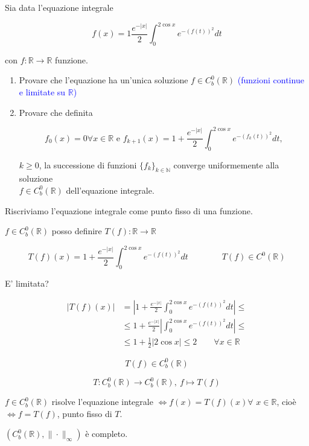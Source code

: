 \begin{exbar}
\begin{example}
	Sia data l'equazione integrale 
	
	$$f(x)=1\frac{e^{-{|x|}}}{2}\int_{0}^{2\cos x}e^{-(f(t))^2}dt$$ 
	
	con $f:\mathbb{R} \rightarrow \mathbb{R}$ funzione.
	
	\begin{enumerate}
		\item Provare che l'equazione ha un'unica soluzione $f \in C^0_b (\mathbb{R})$ \textcolor{blue}{(funzioni continue e limitate su $\mathbb{R}$)}
		
		\item Provare che definita 
		
		$$f_0(x)=0 \forall x \in \mathbb{R} \text{ e } f_{k+1}(x)=1+\frac{e^{-{|x|}}}{2}\int_{0}^{2\cos x}e^{-(f_k(t))^2}dt,$$
		
		$k \geq 0$, la successione di funzioni $\{f_{k}\}_{k \in \mathbb{N}}$ converge uniformemente alla soluzione \\%
		$f \in C^0_b(\mathbb{R})$ dell'equazione integrale.
	\end{enumerate}
	
	Riscriviamo l'equazione integrale come punto fisso di una funzione.
	
	$f\in C^0_b(\mathbb{R})$ posso definire $ T(f):\mathbb{R} \rightarrow \mathbb{R}$
	
	$$T(f)(x)= 1+\frac{e^{-{|x|}}}{2}\int_{0}^{2\cos x}e^{-(f(t))^2}dt \qquad\qquad T(f)\in C^0(\mathbb{R})$$
	
	E' limitata? 
	
	\begin{align*} 
		|T(f)(x)|
		&=|1+\frac{e^{-{|x|}}}{2}\int_{0}^{2\cos x}e^{-(f(t))^2}dt| \leq
		\\
		&\leq 1+ \frac{e^{-{|x|}}}{2}|\int_{0}^{2\cos x}e^{-(f(t))^2}dt|\leq
		\\
		&\leq 1+\frac{1}{2}|2\cos x|\leq 2 \qquad \forall x \in \mathbb{R}
	\end{align*}

	$$T(f)\in C^0_b (\mathbb{R})$$
	
	$$T: C^0_b(\mathbb{R}) \rightarrow C^0_b(\mathbb{R}), \ f \mapsto T(f)$$
	
	$f \in C^0_b(\mathbb{R})$ risolve l'equazione integrale $\Leftrightarrow f(x)= T(f)(x)\forall\,\, x \in \mathbb{R}$, cioè $\Leftrightarrow f=T(f)$, punto fisso di $T$.
	
	$(C^0_b(\mathbb{R}),\|\cdot \|_\infty)$ è completo.
	

\end{example}
\end{exbar}
